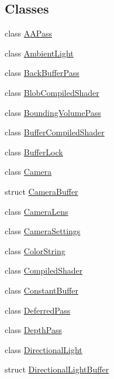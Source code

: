 \subsection*{Classes}
\begin{DoxyCompactItemize}
\item 
class \mbox{\hyperlink{classmage_1_1rendering_1_1_a_a_pass}{A\+A\+Pass}}
\item 
class \mbox{\hyperlink{classmage_1_1rendering_1_1_ambient_light}{Ambient\+Light}}
\item 
class \mbox{\hyperlink{classmage_1_1rendering_1_1_back_buffer_pass}{Back\+Buffer\+Pass}}
\item 
class \mbox{\hyperlink{classmage_1_1rendering_1_1_blob_compiled_shader}{Blob\+Compiled\+Shader}}
\item 
class \mbox{\hyperlink{classmage_1_1rendering_1_1_bounding_volume_pass}{Bounding\+Volume\+Pass}}
\item 
class \mbox{\hyperlink{classmage_1_1rendering_1_1_buffer_compiled_shader}{Buffer\+Compiled\+Shader}}
\item 
class \mbox{\hyperlink{classmage_1_1rendering_1_1_buffer_lock}{Buffer\+Lock}}
\item 
class \mbox{\hyperlink{classmage_1_1rendering_1_1_camera}{Camera}}
\item 
struct \mbox{\hyperlink{structmage_1_1rendering_1_1_camera_buffer}{Camera\+Buffer}}
\item 
class \mbox{\hyperlink{classmage_1_1rendering_1_1_camera_lens}{Camera\+Lens}}
\item 
class \mbox{\hyperlink{classmage_1_1rendering_1_1_camera_settings}{Camera\+Settings}}
\item 
class \mbox{\hyperlink{classmage_1_1rendering_1_1_color_string}{Color\+String}}
\item 
class \mbox{\hyperlink{classmage_1_1rendering_1_1_compiled_shader}{Compiled\+Shader}}
\item 
class \mbox{\hyperlink{classmage_1_1rendering_1_1_constant_buffer}{Constant\+Buffer}}
\item 
class \mbox{\hyperlink{classmage_1_1rendering_1_1_deferred_pass}{Deferred\+Pass}}
\item 
class \mbox{\hyperlink{classmage_1_1rendering_1_1_depth_pass}{Depth\+Pass}}
\item 
class \mbox{\hyperlink{classmage_1_1rendering_1_1_directional_light}{Directional\+Light}}
\item 
struct \mbox{\hyperlink{structmage_1_1rendering_1_1_directional_light_buffer}{Directional\+Light\+Buffer}}

\end{DoxyCompactItemize}
